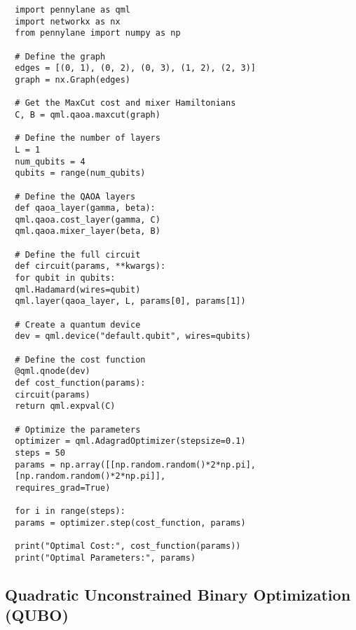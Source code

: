 \begin{verbatim}
  import pennylane as qml
  import networkx as nx
  from pennylane import numpy as np

  # Define the graph
  edges = [(0, 1), (0, 2), (0, 3), (1, 2), (2, 3)]
  graph = nx.Graph(edges)

  # Get the MaxCut cost and mixer Hamiltonians
  C, B = qml.qaoa.maxcut(graph)

  # Define the number of layers
  L = 1
  num_qubits = 4
  qubits = range(num_qubits)

  # Define the QAOA layers
  def qaoa_layer(gamma, beta):
  qml.qaoa.cost_layer(gamma, C)
  qml.qaoa.mixer_layer(beta, B)

  # Define the full circuit
  def circuit(params, **kwargs):
  for qubit in qubits:
  qml.Hadamard(wires=qubit)
  qml.layer(qaoa_layer, L, params[0], params[1])

  # Create a quantum device
  dev = qml.device("default.qubit", wires=qubits)

  # Define the cost function
  @qml.qnode(dev)
  def cost_function(params):
  circuit(params)
  return qml.expval(C)

  # Optimize the parameters
  optimizer = qml.AdagradOptimizer(stepsize=0.1)
  steps = 50
  params = np.array([[np.random.random()*2*np.pi],
  [np.random.random()*2*np.pi]],
  requires_grad=True)

  for i in range(steps):
  params = optimizer.step(cost_function, params)

  print("Optimal Cost:", cost_function(params))
  print("Optimal Parameters:", params)
\end{verbatim}



\vspace{0.3cm}

\subsection*{Quadratic Unconstrained Binary Optimization (QUBO)}


